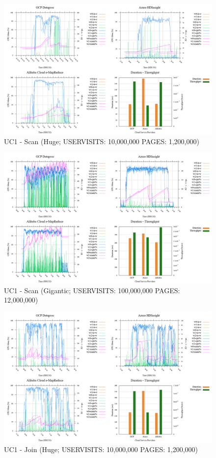 \documentclass[review]{elsarticle}
\begin{document}
\begin{figure}[b]
	\caption{UC1 - Scan (Huge; USERVISITS: 10,000,000 PAGES: 1,200,000)}
	\label{fig:uc1-scan-h-cmidt}
	\includegraphics[width=\textwidth]{uc1-scan-h-cmidt}
	\centering
\end{figure}

\begin{figure}[b]
	\caption{UC1 - Scan (Gigantic; USERVISITS: 100,000,000 PAGES: 12,000,000)}
	\label{fig:uc1-scan-g-cmidt}
	\includegraphics[width=\textwidth]{uc1-scan-g-cmidt}
	\centering
\end{figure}

\begin{figure}[b]
	\caption{UC1 - Join (Huge; USERVISITS: 10,000,000 PAGES: 1,200,000)}
	\label{fig:uc1-join-h-cmidt}
	\includegraphics[width=\textwidth]{uc1-join-h-cmidt}
	\centering
\end{figure}
\end{document}
